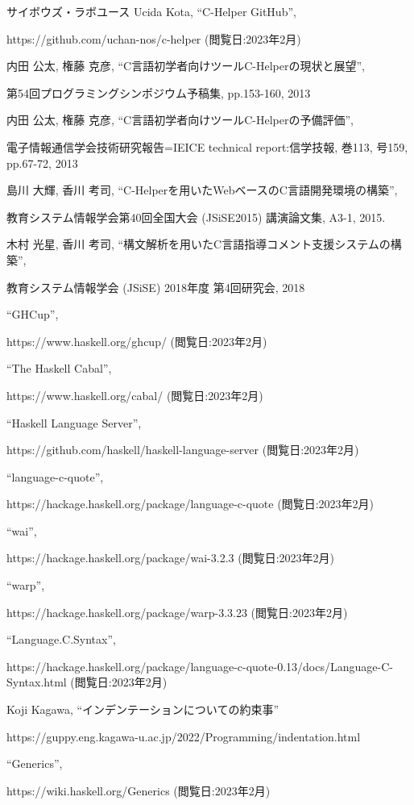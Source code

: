 \documentclass{csspaper}
\begin{document}
\begin{thebibliography}{99} %

サイボウズ・ラボユース Ucida Kota, ``C-Helper GitHub'',

https://github.com/uchan-nos/c-helper (閲覧日:2023年2月)

内田 公太, 権藤 克彦, ``C言語初学者向けツールC-Helperの現状と展望'',

第54回プログラミングシンポジウム予稿集, pp.153-160, 2013

内田 公太, 権藤 克彦, ``C言語初学者向けツールC-Helperの予備評価'',

電子情報通信学会技術研究報告=IEICE technical report:信学技報, 巻113, 号159, pp.67-72, 2013

島川 大輝, 香川 考司, ``C-Helperを用いたWebベースのC言語開発環境の構築'',

教育システム情報学会第40回全国大会 (JSiSE2015) 講演論文集, A3-1, 2015.

木村 光星, 香川 考司, ``構文解析を用いたC言語指導コメント支援システムの構築'',

教育システム情報学会 (JSiSE) 2018年度 第4回研究会, 2018

``GHCup'',

https://www.haskell.org/ghcup/ (閲覧日:2023年2月)

``The Haskell Cabal'',

https://www.haskell.org/cabal/ (閲覧日:2023年2月)

``Haskell Language Server'',

https://github.com/haskell/haskell-language-server (閲覧日:2023年2月)

``language-c-quote'',

https://hackage.haskell.org/package/language-c-quote (閲覧日:2023年2月)

``wai'',

https://hackage.haskell.org/package/wai-3.2.3 (閲覧日:2023年2月)

``warp'',

https://hackage.haskell.org/package/warp-3.3.23 (閲覧日:2023年2月)

``Language.C.Syntax'',

https://hackage.haskell.org/package/language-c-quote-0.13/docs/Language-C-Syntax.html (閲覧日:2023年2月)

Koji Kagawa, ``インデンテーションについての約束事''

https://guppy.eng.kagawa-u.ac.jp/2022/Programming/indentation.html

``Generics'',

https://wiki.haskell.org/Generics (閲覧日:2023年2月)

\end{thebibliography}
\end{document}
